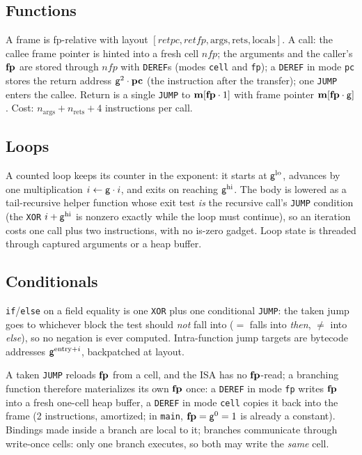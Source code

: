 \subsection{Functions}\label{sec:prog-functions}

A frame is fp-relative with layout $[\mathit{retpc},\mathit{retfp},\mathrm{args},\mathrm{rets},\mathrm{locals}]$. A call: the callee frame pointer is hinted into a fresh cell $\mathit{nfp}$; the arguments and the caller's $\mathbf{fp}$ are stored through $\mathit{nfp}$ with \texttt{DEREF}s (modes \texttt{cell} and \texttt{fp}); a \texttt{DEREF} in mode \texttt{pc} stores the return address $\mathsf{g}^{2}\cdot\mathbf{pc}$ (the instruction after the transfer); one \texttt{JUMP} enters the callee. Return is a single \texttt{JUMP} to $\mathbf{m}[\mathbf{fp}\cdot 1]$ with frame pointer $\mathbf{m}[\mathbf{fp}\cdot \mathsf{g}]$. Cost: $n_{\mathrm{args}}+n_{\mathrm{rets}}+4$ instructions per call.

\subsection{Loops}\label{sec:prog-loops}

A counted loop keeps its counter in the exponent: it starts at $\mathsf{g}^{\mathrm{lo}}$, advances by one multiplication $i\gets\mathsf{g}\cdot i$, and exits on reaching $\mathsf{g}^{\mathrm{hi}}$. The body is lowered as a tail-recursive helper function whose exit test \emph{is} the recursive call's \texttt{JUMP} condition (the \texttt{XOR} $i+\mathsf{g}^{\mathrm{hi}}$ is nonzero exactly while the loop must continue), so an iteration costs one call plus two instructions, with no is-zero gadget. Loop state is threaded through captured arguments or a heap buffer.

\subsection{Conditionals}\label{sec:prog-conditionals}

\texttt{if}/\texttt{else} on a field equality is one \texttt{XOR} plus one conditional \texttt{JUMP}: the taken jump goes to whichever block the test should \emph{not} fall into ($=$ falls into \emph{then}, $\neq$ into \emph{else}), so no negation is ever computed. Intra-function jump targets are bytecode addresses $\mathsf{g}^{\mathrm{entry}+i}$, backpatched at layout.

A taken \texttt{JUMP} reloads $\mathbf{fp}$ from a cell, and the ISA has no $\mathbf{fp}$-read; a branching function therefore materializes its own $\mathbf{fp}$ once: a \texttt{DEREF} in mode \texttt{fp} writes $\mathbf{fp}$ into a fresh one-cell heap buffer, a \texttt{DEREF} in mode \texttt{cell} copies it back into the frame (2 instructions, amortized; in \texttt{main}, $\mathbf{fp}=\mathsf{g}^{0}=1$ is already a constant). Bindings made inside a branch are local to it; branches communicate through write-once cells: only one branch executes, so both may write the \emph{same} cell.

